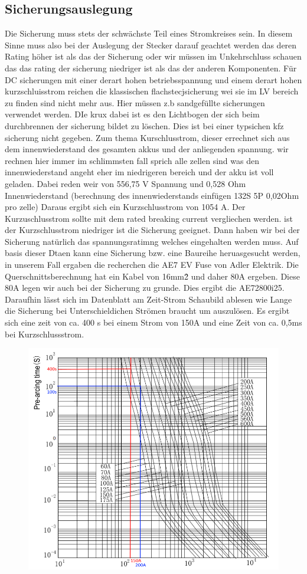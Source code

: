 \subsection{Sicherungsauslegung}
Die Sicherung muss stets der schwächste Teil eines Stromkreises sein. In diesem Sinne muss also bei der Auslegung der Stecker darauf geachtet werden das deren Rating höher ist als das der Sicherung oder wir müssen im Unkehrschluss schauen das das rating der sicherung niedriger ist als das der anderen Komponenten. Für DC sicherungen mit einer derart hohen betriebsspannung und einem derart hohen kurzschluisstrom reichen die klassischen flachstecjsicherung wei sie im LV bereich zu finden sind nicht mehr aus. Hier müssen z.b sandgefüllte sicherungen verwendet werden. DIe krux dabei ist es den Lichtbogen der sich beim durchbrennen der sicherung bildet zu löschen. Dies ist bei einer typsichen kfz sicherung nicht gegeben. Zum thema Kurschlusstrom, dieser errechnet sich aus dem innenwiederstand des gesamten akkus und der anliegenden spannung. wir rechnen hier immer im schlimmsten fall sprich alle zellen sind was den innenwiederstand angeht eher im niedrigeren bereich und der akku ist voll geladen. Dabei reden weir von 556,75 V Spannung und 0,528 Ohm Innenwiederstand (berechnung des innenwiederstands einfügen 132S 5P 0,02Ohm pro zelle) Daraus ergibt sich ein Kurzschlusstrom von 1054 A. Der Kurzuschlusstrom sollte mit dem rated breaking current vergliechen werden. ist der Kurzschlusstrom niedriger ist die Sicherung geeignet. Dann haben wir bei der Sicherung natürlich das spannungsratimng welches eingehalten werden muss. Auf basis dieser Dtaen kann eine Sicherung bzw. eine Baureihe heruasgesucht werden, in unserem Fall ergaben die recherchen die AE7 EV Fuse von Adler Elektrik. Die Querschnittsberechnung hat ein Kabel von 16mm\^2 und daher 80A ergeben. Diese 80A legen wir auch bei der Sicherung zu grunde. Dies ergibt die AE72800i25. Daraufhin lässt sich im Datenblatt am Zeit-Strom Schaubild ablesen wie Lange die Sicherung bei Unterschieldichen Strömen braucht um auszulösen. Es ergibt sich eine zeit von ca. 400 s bei einem Strom von 150A und eine Zeit von ca. 0,5ms bei Kurzschlussstrom.

\begin{figure}[h]
	\centering
	\includegraphics[width=0.7\linewidth]{bilder/Zeit_Strom_TSFUSE}
	\caption{}
	\label{fig:zeitstromtsfuse}
\end{figure}

